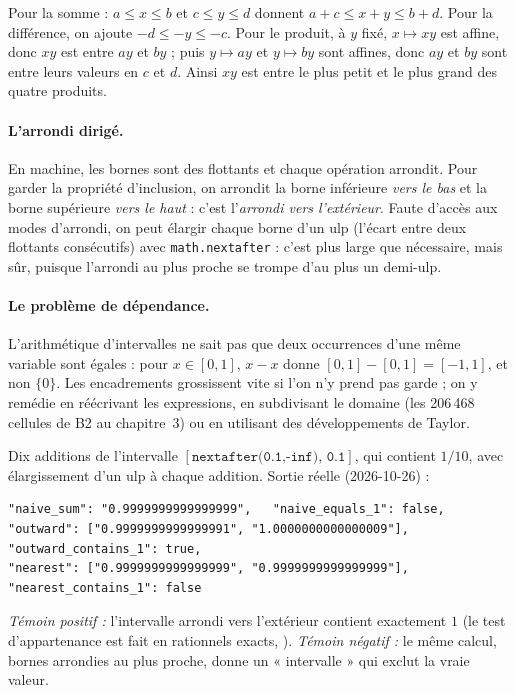 \begin{humanproof}
Pour la somme : $a\le x\le b$ et $c\le y\le d$ donnent $a+c\le x+y\le b+d$. Pour la différence, on ajoute
$-d\le-y\le-c$. Pour le produit, à $y$ fixé, $x\mapsto xy$ est affine, donc $xy$ est entre $ay$ et $by$ ; puis $y\mapsto
ay$ et $y\mapsto by$ sont affines, donc $ay$ et $by$ sont entre leurs valeurs en $c$ et $d$. Ainsi $xy$ est entre le
plus petit et le plus grand des quatre produits.
\end{humanproof}

\paragraph{L'arrondi dirigé.} En machine, les bornes sont des flottants et chaque opération arrondit. Pour garder la
propriété d'inclusion, on arrondit la borne inférieure \emph{vers le bas} et la borne supérieure \emph{vers le haut} :
c'est l'\emph{arrondi vers l'extérieur}. Faute d'accès aux modes d'arrondi, on peut élargir chaque borne d'un ulp
(l'écart entre deux flottants consécutifs) avec \texttt{math.nextafter} : c'est plus large que nécessaire, mais sûr,
puisque l'arrondi au plus proche se trompe d'au plus un demi-ulp.

\paragraph{Le problème de dépendance.} L'arithmétique d'intervalles ne sait pas que deux occurrences d'une même
variable sont égales : pour $x\in[0,1]$, $x-x$ donne $[0,1]-[0,1]=[-1,1]$, et non $\{0\}$. Les encadrements grossissent
vite si l'on n'y prend pas garde ; on y remédie en réécrivant les expressions, en subdivisant le domaine (les 206\,468
cellules de B2 au chapitre~3) ou en utilisant des développements de Taylor.

\begin{numbox}
Dix additions de l'intervalle $[\texttt{nextafter(0.1,-inf)},\,\texttt{0.1}]$, qui contient $1/10$, avec élargissement
d'un ulp à chaque addition. Sortie réelle (2026-10-26) :
\begin{lstlisting}[style=appC,language={}]
"naive_sum": "0.9999999999999999",   "naive_equals_1": false,
"outward": ["0.9999999999999991", "1.0000000000000009"],   "outward_contains_1": true,
"nearest": ["0.9999999999999999", "0.9999999999999999"],   "nearest_contains_1": false
\end{lstlisting}
\emph{Témoin positif :} l'intervalle arrondi vers l'extérieur contient exactement $1$ (le test d'appartenance est fait
en rationnels exacts, ). \emph{Témoin négatif :} le même calcul, bornes arrondies au plus
proche, donne un « intervalle » qui exclut la vraie valeur.
\end{numbox}

